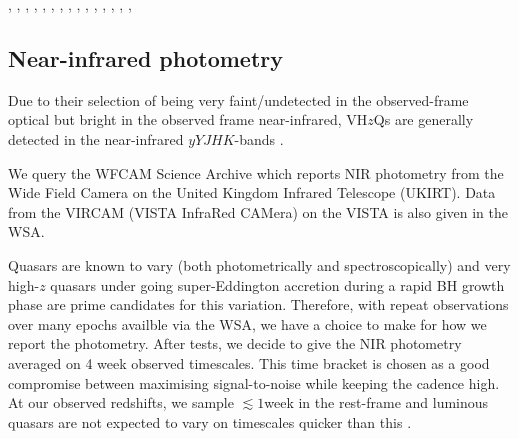 \documentclass[usenatbib]{mnras}
\begin{document}
\citet{Fan2000}, \citet{Fan2001c}, \citet{Fan2003} , \citet{Fan2004}, \citet{Mahabal2005}, \citet{Cool2006}, \citet{Fan2006}, \citet{Goto2006}, \citet{McGreer2006}, \citet{Carilli2007}, \citet{Kurk2007}, \citet{Stern2007}, \citet{Venemans2007}, \citet{Willott2007}, \citet{Jiang2008}, \citet{Wang2008}         \citet{Jiang2009}         \citet{Kurk2009}          \citet{Mortlock2009}      \citet{Willott2009}       \citet{Carilli2010}       \citet{Wang2010}          \citet{Willott2010a}      \citet{Willott2010b}      \citet{DeRosa2011}        \citet{Mortlock2011}     \citet{Wang2011}          \citet{Zeimann2011}       \citet{Morganson2012}    \citet{Venemans2012}      \citet{McGreer2013}       \citet{Venemans2013}      \citet{Wang2013}         \citet{Willott2013b}     \citet{Banados2014}       \citet{Calura2014}        \citet{Leipski2014}       \citet{Banados2015a}      \citet{Banados2015b}      \citet{Becker2015}        \citet{Carnall2015}       \citet{Jiang2015}        \citet{Kashikawa2015}    \citet{Kim2015}          \citet{Reed2015}          \citet{Venemans2015a}    \citet{Venemans2015b}    \citet{Willott2015}      \citet{Wu2015}           \citet{Venemans2016}      \citet{Wang2016_WISE}    \citet{Matsuoka2016}      
\citet{WangR2016}          


\subsection{Near-infrared photometry}
Due to their selection of being very faint/undetected in the
observed-frame optical but bright in the observed frame near-infrared,
VH$z$Qs are generally detected in the near-infrared $yYJHK$-bands
\citep[$\approx$0.98-2.38$\mu$m; e.g., ][]{Peth2011}.

We query the WFCAM Science Archive
\citep[\href{http://wsa.roe.ac.uk/}{WSA}; ][]{Hambly2008} which
reports NIR photometry from the Wide Field Camera \citep[WFCAM;
][]{Casali2007} on the United Kingdom Infrared Telescope (UKIRT).
Data from the VIRCAM (VISTA InfraRed CAMera) on the VISTA
\citep[Visible and Infrared Survey Telescope for Astronomy;
][]{Emerson2006, Dalton2006} is also given in the WSA.

Quasars are known to vary (both photometrically and spectroscopically)
and very high-$z$ quasars under going super-Eddington accretion during
a rapid BH growth phase are prime candidates for this variation.
Therefore, with repeat observations over many epochs availble via the
WSA, we have a choice to make for how we report the photometry. After
tests, we decide to give the NIR photometry averaged on 4 week
observed timescales. This time bracket is chosen as a good compromise
between maximising signal-to-noise while keeping the cadence high. At
our observed redshifts, we sample $\lesssim1$week in the rest-frame
and luminous quasars are not expected to vary on timescales quicker
than this \citep[e.g., ][]{Lawrence2016_ASPC}. 
 
\end{document}
